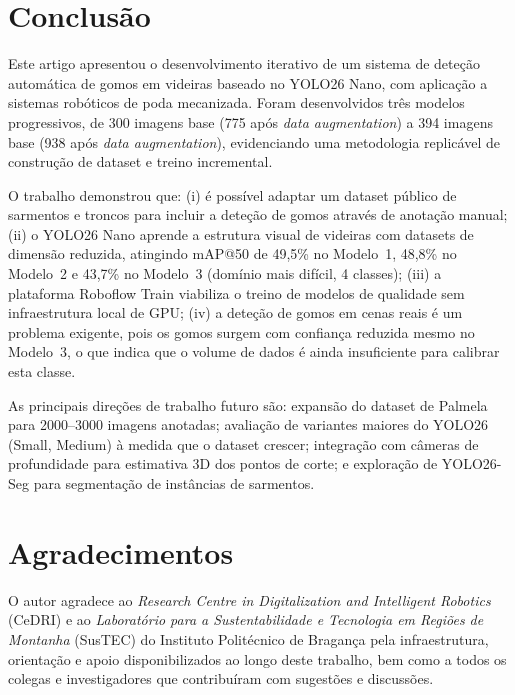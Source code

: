 \documentclass[12pt, a4paper]{article}
\begin{document}
\section{Conclusão}

Este artigo apresentou o desenvolvimento iterativo de um sistema de deteção
automática de gomos em videiras baseado no YOLO26 Nano, com aplicação a
sistemas robóticos de poda mecanizada. Foram desenvolvidos três modelos
progressivos, de 300 imagens base (775 após \textit{data augmentation})
a 394 imagens base (938 após \textit{data augmentation}), evidenciando uma
metodologia replicável de construção de dataset e treino incremental.

O trabalho demonstrou que: (i) é possível adaptar um dataset público de
sarmentos e troncos para incluir a deteção de gomos através de anotação
manual; (ii) o YOLO26 Nano aprende a estrutura visual de videiras com
datasets de dimensão reduzida, atingindo mAP@50 de 49,5\% no Modelo~1,
48,8\% no Modelo~2 e 43,7\% no Modelo~3 (domínio mais difícil, 4 classes); (iii) a plataforma
Roboflow Train viabiliza o treino de modelos de qualidade sem infraestrutura
local de GPU; (iv) a deteção de gomos em cenas reais é um problema exigente,
pois os gomos surgem com confiança reduzida mesmo no Modelo~3, o que indica
que o volume de dados é ainda insuficiente para calibrar esta classe.

As principais direções de trabalho futuro são: expansão do dataset de
Palmela para 2000--3000 imagens anotadas; avaliação de variantes maiores
do YOLO26 (Small, Medium) à medida que o dataset crescer; integração com
câmeras de profundidade para estimativa 3D dos pontos de corte; e exploração
de YOLO26-Seg para segmentação de instâncias de sarmentos.

\section*{Agradecimentos}

O autor agradece ao \textit{Research Centre in Digitalization and
Intelligent Robotics} (CeDRI) e ao \textit{Laboratório para a
Sustentabilidade e Tecnologia em Regiões de Montanha} (SusTEC) do
Instituto Politécnico de Bragança pela infraestrutura, orientação e apoio
disponibilizados ao longo deste trabalho, bem como a todos os colegas e
investigadores que contribuíram com sugestões e discussões.
\end{document}
